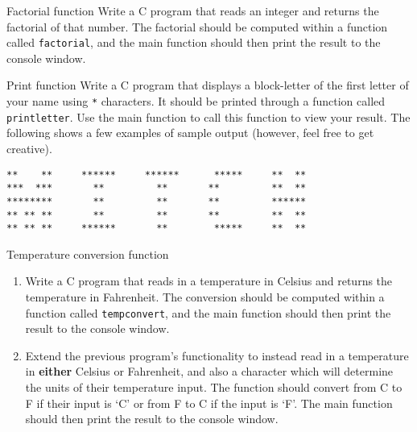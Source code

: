 \documentclass{pass}
\begin{document}
\begin{task}{Factorial function}{}
Write a C program that reads an integer and returns the factorial of that number. The factorial should be computed within a function called \texttt{factorial}, and the main function should then print the result to the console window.
\end{task}

\begin{task}{Print function}{}
Write a C program that displays a block-letter of the first letter of your name using \texttt{*} characters. It should be printed through a function called \texttt{print\textunderscore letter}. Use the main function to call this function to view your result. The following shows a few examples of sample output (however, feel free to get creative).
\begin{lstlisting}[style=CStyle]
**    **     ******     ******      *****     **  **
***  ***       **         **       **         **  **
********       **         **       **         ******
** ** **       **         **       **         **  **
** ** **     ******       **        *****     **  **
\end{lstlisting}
\end{task}

\begin{task}{Temperature conversion function}{}
	\begin{enumerate}
	\item Write a C program that reads in a temperature in Celsius and returns the temperature in Fahrenheit. The conversion should be computed within a function called \texttt{temp\textunderscore convert}, and the main function should then print the result to the console window. \\[6pt]
	\item Extend the previous program's functionality to instead read in a temperature in \textbf{either} Celsius or Fahrenheit, and also a character which will determine the units of their temperature input. The function should convert from C to F if their input is `C' or from F to C if the input is `F'. The main function should then print the result to the console window.
	\end{enumerate}
\end{task}

\end{document}
